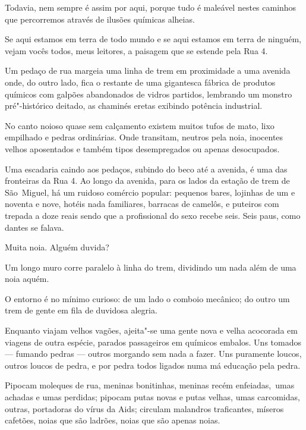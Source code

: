 Todavia, nem sempre é assim por aqui, porque tudo é maleável nestes
caminhos que percorremos através de ilusões químicas alheias.

\asterisc{}

Se aqui estamos em terra de todo mundo e se aqui estamos em terra de
ninguém, vejam vocês todos, meus leitores, a paisagem que se estende
pela Rua 4.

Um pedaço de rua margeia uma linha de trem em proximidade a uma avenida
onde, do outro lado, fica o restante de uma gigantesca fábrica de
produtos químicos com galpões abandonados de vidros partidos, lembrando
um monstro pré"-histórico deitado, as chaminés eretas exibindo potência
industrial.

No canto noioso quase sem calçamento existem muitos tufos de mato, lixo
empilhado e pedras ordinárias. Onde transitam, neutros pela noia,
inocentes velhos aposentados e também tipos desempregados ou apenas
desocupados.

Uma escadaria caindo aos pedaços, subindo do beco até a avenida, é uma
das fronteiras da Rua 4. Ao longo da avenida, para os lados da estação
de trem de São~Miguel, há um ruidoso comércio popular: pequenos bares,
lojinhas de um e noventa e nove, hotéis nada familiares, barracas de
camelôs, e puteiros com trepada a doze reais sendo que a profissional do
sexo recebe seis. Seis paus, como dantes se falava.

Muita noia. Alguém duvida?

\asterisc{}

Um longo muro corre paralelo à linha do trem, dividindo um nada além de
uma noia aquém.

O entorno é no mínimo curioso: de um lado o comboio mecânico; do outro
um trem de gente em fila de duvidosa alegria.

Enquanto viajam velhos vagões, ajeita"-se uma gente nova e velha
acocorada em viagens de outra espécie, parados passageiros em químicos
embalos. Uns tomados --- fumando pedras --- outros morgando sem nada a
fazer. Uns puramente loucos, outros loucos de pedra, e por pedra todos
ligados numa má educação pela pedra.

\asterisc{}

Pipocam moleques de rua, meninas bonitinhas, meninas recém
enfeiadas,~umas achadas e umas perdidas; pipocam putas novas e putas
velhas, umas carcomidas, outras, portadoras do vírus da Aids; circulam
malandros traficantes, míseros cafetões, noias que são ladrões, noias
que são apenas noias.

